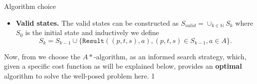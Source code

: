 \begin{section}{Algorithm choice}
\begin{itemize}
\item \textbf{Valid states.} The valid states can be constructed as 
  $S_{valid} = \cup_{k\in \mathbb{N}}S_k$ where $S_0$ is the initial state and inductively we define
  \begin{equation*}
    S_k = S_{k-1}\cup \{\texttt{Result}((p,t,s),a), (p,t,s)\in S_{k-1}, a\in A \}.
  \end{equation*}
\end{itemize}

Now, from \cite{rn} we choose the $A*$-algorithm, as an informed search strategy, which, given a specific cost function as will be explained below, provides an \textbf{optimal} algorithm to solve the well-posed problem here. 1
\end{section}